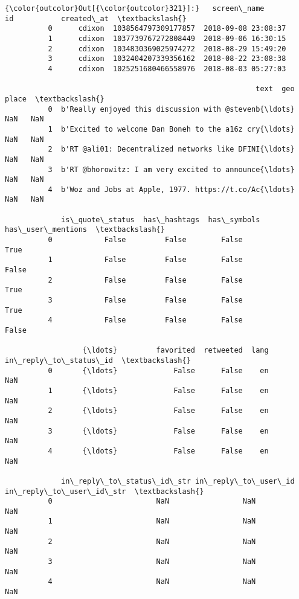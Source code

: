 \documentclass[11pt]{article}
\begin{document}
\begin{Verbatim}[commandchars=\\\{\}]
{\color{outcolor}Out[{\color{outcolor}321}]:}   screen\_name                   id           created\_at  \textbackslash{}
          0      cdixon  1038564797309177857  2018-09-08 23:08:37   
          1      cdixon  1037739767272808449  2018-09-06 16:30:15   
          2      cdixon  1034830369025974272  2018-08-29 15:49:20   
          3      cdixon  1032404207339356162  2018-08-22 23:08:38   
          4      cdixon  1025251680466558976  2018-08-03 05:27:03   
          
                                                          text  geo place  \textbackslash{}
          0  b'Really enjoyed this discussion with @stevenb{\ldots}  NaN   NaN   
          1  b'Excited to welcome Dan Boneh to the a16z cry{\ldots}  NaN   NaN   
          2  b'RT @ali01: Decentralized networks like DFINI{\ldots}  NaN   NaN   
          3  b'RT @bhorowitz: I am very excited to announce{\ldots}  NaN   NaN   
          4  b'Woz and Jobs at Apple, 1977. https://t.co/Ac{\ldots}  NaN   NaN   
          
             is\_quote\_status  has\_hashtags  has\_symbols  has\_user\_mentions  \textbackslash{}
          0            False         False        False               True   
          1            False         False        False              False   
          2            False         False        False               True   
          3            False         False        False               True   
          4            False         False        False              False   
          
                  {\ldots}         favorited  retweeted  lang  in\_reply\_to\_status\_id  \textbackslash{}
          0       {\ldots}             False      False    en                    NaN   
          1       {\ldots}             False      False    en                    NaN   
          2       {\ldots}             False      False    en                    NaN   
          3       {\ldots}             False      False    en                    NaN   
          4       {\ldots}             False      False    en                    NaN   
          
             in\_reply\_to\_status\_id\_str in\_reply\_to\_user\_id  in\_reply\_to\_user\_id\_str  \textbackslash{}
          0                        NaN                 NaN                      NaN   
          1                        NaN                 NaN                      NaN   
          2                        NaN                 NaN                      NaN   
          3                        NaN                 NaN                      NaN   
          4                        NaN                 NaN                      NaN   
          

\end{Verbatim}
\end{document}
